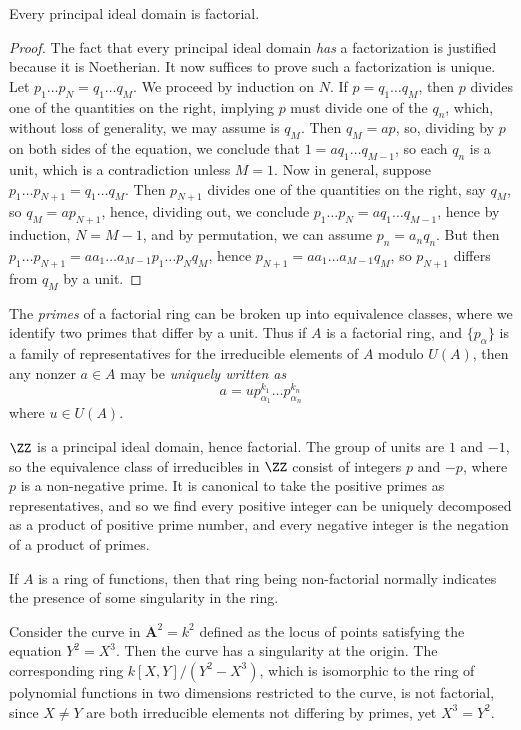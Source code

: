 \begin{theorem}
    Every principal ideal domain is factorial.
\end{theorem}
\begin{proof}
    The fact that every principal ideal domain {\it has} a factorization is justified because it is Noetherian. It now suffices to prove such a factorization is unique. Let $p_1 \dots p_N = q_1 \dots q_M$. We proceed by induction on $N$. If $p = q_1 \dots q_M$, then $p$ divides one of the quantities on the right, implying $p$ must divide one of the $q_n$, which, without loss of generality, we may assume is $q_M$. Then $q_M = ap$, so, dividing by $p$ on both sides of the equation, we conclude that $1 = a q_1 \dots q_{M-1}$, so each $q_n$ is a unit, which is a contradiction unless $M = 1$. Now in general, suppose $p_1 \dots p_{N+1} = q_1 \dots q_M$. Then $p_{N+1}$ divides one of the quantities on the right, say $q_M$, so $q_M = ap_{N+1}$, hence, dividing out, we conclude $p_1 \dots p_N = a q_1 \dots q_{M-1}$, hence by induction, $N = M-1$, and by permutation, we can assume $p_n = a_nq_n$. But then $p_1 \dots p_{N+1} = aa_1 \dots a_{M-1} p_1 \dots p_N q_M$, hence $p_{N+1} = aa_1 \dots a_{M-1} q_M$, so $p_{N+1}$ differs from $q_M$ by a unit.
\end{proof}

The {\it primes} of a factorial ring can be broken up into equivalence classes, where we identify two primes that differ by a unit. Thus if $A$ is a factorial ring, and $\{ p_\alpha \}$ is a family of representatives for the irreducible elements of $A$ modulo $U(A)$, then any nonzer $a \in A$ may be \emph{uniquely written as}
%
\[ a = u p_{\alpha_1}^{k_1} \dots p_{\alpha_n}^{k_n} \]
%
where $u \in U(A)$.

\begin{example}
    $\ZZ$ is a principal ideal domain, hence factorial. The group of units are $1$ and $-1$, so the equivalence class of irreducibles in $\ZZ$ consist of integers $p$ and $-p$, where $p$ is a non-negative prime. It is canonical to take the positive primes as representatives, and so we find every positive integer can be uniquely decomposed as a product of positive prime number, and every negative integer is the negation of a product of primes.
\end{example}

If $A$ is a ring of functions, then that ring being non-factorial normally indicates the presence of some singularity in the ring.

\begin{example}
    Consider the curve in $\mathbf{A}^2 = k^2$ defined as the locus of points satisfying the equation $Y^2 = X^3$. Then the curve has a singularity at the origin. The corresponding ring $k[X,Y]/(Y^2 - X^3)$, which is isomorphic to the ring of polynomial functions in two dimensions restricted to the curve, is not factorial, since $X \neq Y$ are both irreducible elements not differing by primes, yet $X^3 = Y^2$.
\end{example}

